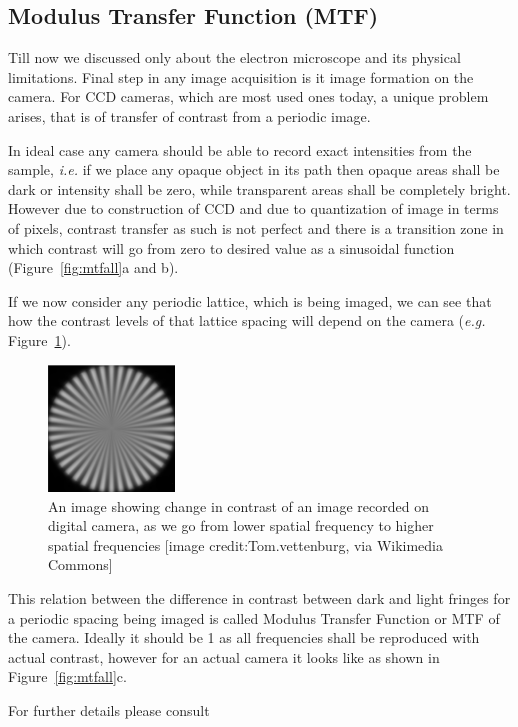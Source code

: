 \subsection{Modulus Transfer Function (MTF)}
Till now we discussed only about the electron microscope and its physical limitations.
Final step in any image acquisition is it image formation on the camera.
For CCD cameras, which are most used ones today, a unique problem arises, that is of transfer of contrast from a periodic image.

In ideal case any camera should be able to record exact intensities from the sample, \textit{i.e.} if we place any opaque object in its path then opaque areas shall be dark or intensity shall be zero, while transparent areas shall be completely bright.
However due to construction of CCD and due to quantization of image in terms of pixels, contrast transfer as such is not perfect and there is a transition zone in which contrast will go from zero to desired value as a sinusoidal function (Figure~\ref{fig:mtfall}a and b).

If we now consider any periodic lattice, which is being imaged, we can see that how the contrast levels of that lattice spacing will depend on the camera (\textit{e.g.} Figure~\ref{fig:mtfexample}).

\begin{figure}[b]
    \centering
    \includegraphics[width=0.30\textwidth]{figures/mtfeg.pdf}
    \caption{An image showing change in contrast of an image recorded on digital camera, as we go from lower spatial frequency to higher spatial frequencies [image credit:Tom.vettenburg, via Wikimedia Commons]}
    \label{fig:mtfexample}
\end{figure}

This relation between the difference in contrast between dark and light fringes for a periodic spacing being imaged is called Modulus Transfer Function or MTF of the camera.
Ideally it should be 1 as all frequencies shall be reproduced with actual contrast, however for an actual camera it looks like as shown in Figure~\ref{fig:mtfall}c.

For further details please consult \cite{VandenBroek2012,Koeck2000}